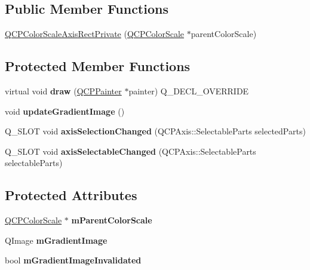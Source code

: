 \subsection*{Public Member Functions}
\begin{DoxyCompactItemize}
\item 
\hyperlink{classQCPColorScaleAxisRectPrivate_ad3b242f75dd2b33581364a4e668a80db}{Q\+C\+P\+Color\+Scale\+Axis\+Rect\+Private} (\hyperlink{classQCPColorScale}{Q\+C\+P\+Color\+Scale} $\ast$parent\+Color\+Scale)
\end{DoxyCompactItemize}
\subsection*{Protected Member Functions}
\begin{DoxyCompactItemize}
\item 
\mbox{\label{classQCPColorScaleAxisRectPrivate_a52a21c7cbe086cd587c955cfe6e25e3b}} 
virtual void {\bfseries draw} (\hyperlink{classQCPPainter}{Q\+C\+P\+Painter} $\ast$painter) Q\+\_\+\+D\+E\+C\+L\+\_\+\+O\+V\+E\+R\+R\+I\+DE
\item 
\mbox{\label{classQCPColorScaleAxisRectPrivate_a73754cab312aeaddea1bfcc67cc079ac}} 
void {\bfseries update\+Gradient\+Image} ()
\item 
\mbox{\label{classQCPColorScaleAxisRectPrivate_a6112ad4291ac1695d37659cb049d598d}} 
Q\+\_\+\+S\+L\+OT void {\bfseries axis\+Selection\+Changed} (Q\+C\+P\+Axis\+::\+Selectable\+Parts selected\+Parts)
\item 
\mbox{\label{classQCPColorScaleAxisRectPrivate_a66d2baed86966bb03a6d7c32dc7d59f7}} 
Q\+\_\+\+S\+L\+OT void {\bfseries axis\+Selectable\+Changed} (Q\+C\+P\+Axis\+::\+Selectable\+Parts selectable\+Parts)
\end{DoxyCompactItemize}
\subsection*{Protected Attributes}
\begin{DoxyCompactItemize}
\item 
\mbox{\label{classQCPColorScaleAxisRectPrivate_a311c73f51a4cb0b556388197833cf099}} 
\hyperlink{classQCPColorScale}{Q\+C\+P\+Color\+Scale} $\ast$ {\bfseries m\+Parent\+Color\+Scale}
\item 
\mbox{\label{classQCPColorScaleAxisRectPrivate_ad4f7c8ee1c6012d9950870811773119c}} 
Q\+Image {\bfseries m\+Gradient\+Image}
\item 
\mbox{\label{classQCPColorScaleAxisRectPrivate_a2c0b15b071e1f93006b48b5be022a631}} 
bool {\bfseries m\+Gradient\+Image\+Invalidated}
\end{DoxyCompactItemize}

